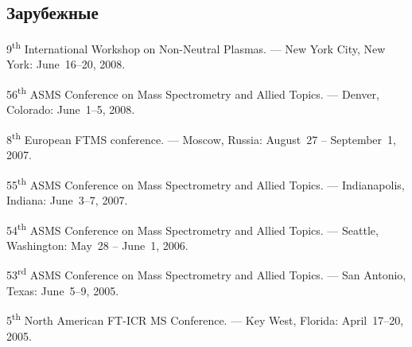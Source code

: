 \documentclass[12pt, a4paper]{article}
\begin{document}
\subsection*{Зарубежные}
\begin{compactenum}
    \item
        9\textsuperscript{th} International Workshop on Non-Neutral Plasmas. ---
        New York City, New York:
        June~16--20, 2008.
    \item
        56\textsuperscript{th} ASMS Conference on Mass Spectrometry and Allied Topics. ---
        Denver, Colorado:
        June~1--5, 2008.
    \item
        8\textsuperscript{th} European FTMS conference. ---
        Moscow, Russia:
        August~27 -- September~1, 2007.
    \item
        55\textsuperscript{th} ASMS Conference on Mass Spectrometry and Allied Topics. ---
        Indianapolis, Indiana:
        June~3--7, 2007.
    \item
        54\textsuperscript{th} ASMS Conference on Mass Spectrometry and Allied Topics. ---
        Seattle, Washington:
        May~28 -- June~1, 2006.
    \item
        53\textsuperscript{rd} ASMS Conference on Mass Spectrometry and Allied Topics. ---
        San Antonio, Texas:
        June~5--9, 2005.
    \item
        5\textsuperscript{th} North American FT-ICR MS Conference. ---
        Key West, Florida:
        April~17--20, 2005.
\end{compactenum}
\end{document}

